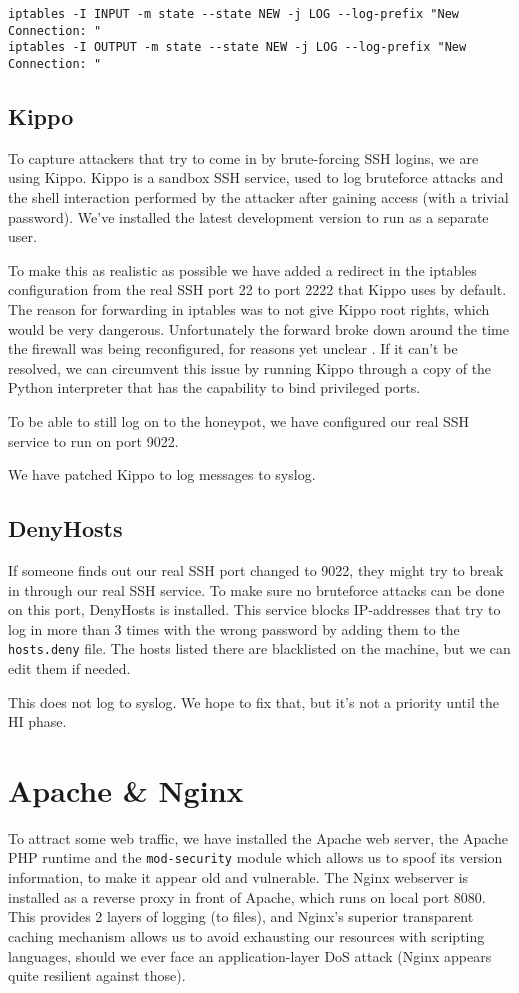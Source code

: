 \documentclass[11pt]{article} %
\begin{document}
\begin{verbatim}
iptables -I INPUT -m state --state NEW -j LOG --log-prefix "New Connection: "
iptables -I OUTPUT -m state --state NEW -j LOG --log-prefix "New Connection: "
\end{verbatim}

\subsection{Kippo}
To capture attackers that try to come in by brute-forcing SSH logins, we are using Kippo. 
Kippo is a sandbox SSH service, used to log bruteforce attacks and the shell interaction performed by the attacker after gaining access (with a trivial password). 
We've installed the latest development version to run as a separate user.

To make this as realistic as possible we have added a redirect in the iptables configuration from the real SSH port 22 to port 2222 that Kippo uses by default.
The reason for forwarding in iptables was to not give Kippo root rights, which would be very dangerous. %
Unfortunately the forward broke down around the time the firewall was being reconfigured, for reasons yet unclear . 
If it can't be resolved, we can circumvent this issue by running Kippo through a copy of the Python interpreter that has the capability to bind privileged ports.

To be able to still log on to the honeypot, we have configured our real SSH service to run on port 9022.

We have patched Kippo to log messages to syslog.

\subsection{DenyHosts}
If someone finds out our real SSH port changed to 9022, they might try to break in through our real SSH service.
To make sure no bruteforce attacks can be done on this port, DenyHosts is installed.
This service blocks IP-addresses that try to log in more than 3 times with the wrong password by adding them to the \verb|hosts.deny| file.
The hosts listed there are blacklisted on the machine, but we can edit them if needed.

This does not log to syslog. We hope to fix that, but it's not a priority until the HI phase.

\section{Apache \& Nginx}
To attract some web traffic, we have installed the Apache web server, the Apache PHP runtime and the \verb|mod-security| module which allows us to spoof its version information, to make it appear old and vulnerable.
The Nginx webserver is installed as a reverse proxy in front of Apache, which runs on local port 8080.
This provides 2 layers of logging (to files), and Nginx's superior transparent caching mechanism allows us to avoid exhausting our resources with scripting languages, should we ever face an application-layer DoS attack (Nginx appears quite resilient against those).
\end{document}
